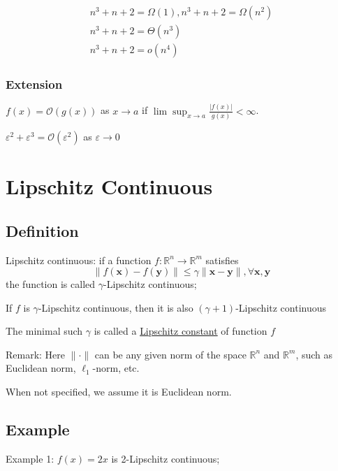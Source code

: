 \documentclass[11pt]{elegantbook}
\begin{document}
\begin{example}
\begin{equation}
    \begin{aligned}
        n^3+n+2=\Omega(1),n^3+n+2=\Omega(n^2)\\
        n^3+n+2=\Theta(n^3)\\
        n^3+n+2=o(n^4)
    \end{aligned}
    \nonumber
\end{equation}
\end{example}

\subsection{Extension}
$f(x)=\mathcal{O}(g(x))$ as $x \rightarrow a$ if $\lim \sup_{x \rightarrow a}\frac{|f(x)|}{g(x)}<\infty$.

\begin{example}
$\varepsilon^2+\varepsilon^3=\mathcal{O}(\varepsilon^2)$ as $\varepsilon \rightarrow 0$
\end{example}

\chapter{Lipschitz Continuous}
\section{Definition}
\begin{definition}
    Lipschitz continuous: if a function $f: \mathbb{R}^{n} \rightarrow \mathbb{R}^{m}$ satisfies
    $$
    \|f(\mathbf{x})-f(\mathbf{y})\| \leq \gamma\|\mathbf{x}-\mathbf{y}\|, \forall \mathbf{x}, \mathbf{y}
    $$
    the function is called $\gamma$-Lipschitz continuous;
\end{definition}
If $f$ is $\gamma$-Lipschitz continuous, then it is also $(\gamma+1)$-Lipschitz continuous

The minimal such $\gamma$ is called a \underline{Lipschitz constant} of function $f$

Remark: Here $\|\cdot\|$ can be any given norm of the space $\mathbb{R}^{n}$ and $\mathbb{R}^{m}$, such as Euclidean norm, $\ell_{1}$-norm, etc.

When not specified, we assume it is Euclidean norm.

\section{Example}
Example 1: $f(x)=2 x$ is 2-Lipschitz continuous;
\end{document}
